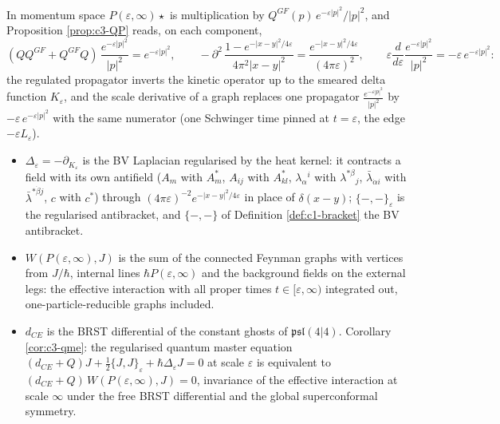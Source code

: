 \begin{remark}[Physics notation: the two kernels at $t=\varepsilon$]
In momentum space $P(\varepsilon,\infty)\star$ is multiplication by $Q^{GF}(p)\,e^{-\varepsilon|p|^2}/|p|^2$, and Proposition \ref{prop:c3-QP} reads, on each component,
\[
(QQ^{GF}+Q^{GF}Q)\,\frac{e^{-\varepsilon|p|^2}}{|p|^2}=e^{-\varepsilon|p|^2},\qquad -\partial^2\,\frac{1-e^{-|x-y|^2/4\varepsilon}}{4\pi^2|x-y|^2}=\frac{e^{-|x-y|^2/4\varepsilon}}{(4\pi\varepsilon)^2},\qquad \varepsilon\frac{d}{d\varepsilon}\frac{e^{-\varepsilon|p|^2}}{|p|^2}=-\varepsilon\,e^{-\varepsilon|p|^2}:
\]
the regulated propagator inverts the kinetic operator up to the smeared delta function $K_\varepsilon$, and the scale derivative of a graph replaces one propagator $\frac{e^{-\varepsilon|p|^2}}{|p|^2}$ by $-\varepsilon\,e^{-\varepsilon|p|^2}$ with the same numerator (one Schwinger time pinned at $t=\varepsilon$, the edge $-\varepsilon L_\varepsilon$).
\end{remark}

\begin{remark}
\begin{itemize}
\item $\Delta_\varepsilon=-\partial_{K_\varepsilon}$ is the BV Laplacian regularised by the heat kernel: it contracts a field with its own antifield ($A_m$ with $A^*_m$, $A_{ij}$ with $A^*_{kl}$, $\lambda_\alpha{}^i$ with $\lambda^{*\beta}{}_j$, $\bar\lambda_{\dot\alpha i}$ with $\bar\lambda^{*\dot\beta j}$, $c$ with $c^*$) through $(4\pi\varepsilon)^{-2}e^{-|x-y|^2/4\varepsilon}$ in place of $\delta(x-y)$; $\{-,-\}_\varepsilon$ is the regularised antibracket, and $\{-,-\}$ of Definition \ref{def:c1-bracket} the BV antibracket.
\item $W(P(\varepsilon,\infty),J)$ is the sum of the connected Feynman graphs with vertices from $J/\hbar$, internal lines $\hbar P(\varepsilon,\infty)$ and the background fields on the external legs: the effective interaction with all proper times $t\in[\varepsilon,\infty)$ integrated out, one-particle-reducible graphs included.
\item $d_{CE}$ is the BRST differential of the constant ghosts of $\mathfrak{psl}(4|4)$. Corollary \ref{cor:c3-qme}: the regularised quantum master equation $(d_{CE}+Q)J+\tfrac12\{J,J\}_\varepsilon+\hbar\Delta_\varepsilon J=0$ at scale $\varepsilon$ is equivalent to $(d_{CE}+Q)\,W(P(\varepsilon,\infty),J)=0$, invariance of the effective interaction at scale $\infty$ under the free BRST differential and the global superconformal symmetry.
\end{itemize}
\end{remark}

